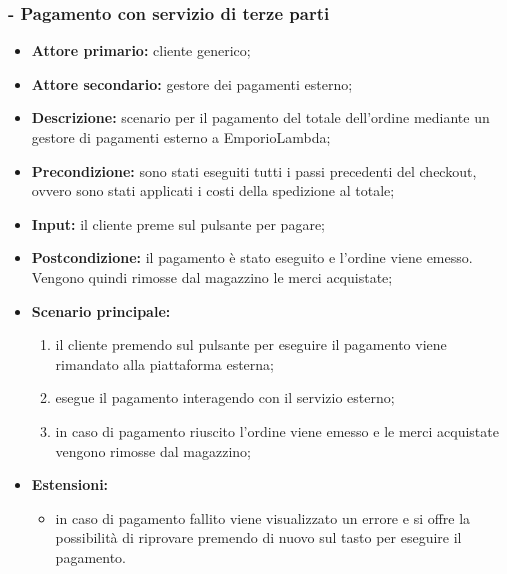 \subsubsection{ - Pagamento con servizio di terze parti}
\begin{itemize}
    \item \textbf{Attore primario:} cliente generico;
    \item \textbf{Attore secondario:} gestore dei pagamenti esterno;
    \item \textbf{Descrizione:} scenario per il pagamento del totale dell'ordine mediante un gestore di pagamenti esterno a EmporioLambda;
    \item \textbf{Precondizione:} sono stati eseguiti tutti i passi precedenti del checkout, ovvero sono stati applicati i costi della spedizione al totale;
    \item \textbf{Input:} il cliente preme sul pulsante per pagare;
    \item \textbf{Postcondizione:} il pagamento è stato eseguito e l'ordine viene emesso. Vengono quindi rimosse dal magazzino le merci acquistate;
    \item \textbf{Scenario principale:}
          \begin{enumerate}
              \item il cliente premendo sul pulsante per eseguire il pagamento viene rimandato alla piattaforma esterna;
              \item esegue il pagamento interagendo con il servizio esterno;
              \item in caso di pagamento riuscito l'ordine viene emesso e le merci acquistate vengono rimosse dal magazzino;
          \end{enumerate}
    \item \textbf{Estensioni:}
          \begin{itemize}
              \item in caso di pagamento fallito viene visualizzato un errore e si offre la possibilità di riprovare premendo di nuovo sul tasto per eseguire il pagamento.
          \end{itemize}
\end{itemize}

\stepUserCase
